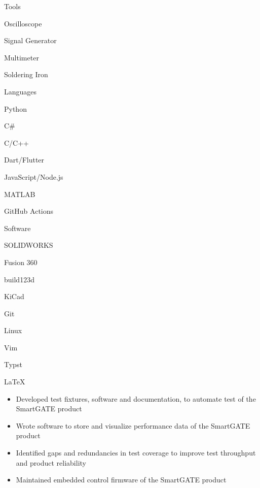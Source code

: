 \documentclass{resume}
\author{Jasper Chan}
\begin{document}
\maketitle

\vspace{-1em} %
\TechnicalSkills

\begin{TechSkills}{Tools}
    \item Oscilloscope
    \item Signal Generator
    \item Multimeter
    \item Soldering Iron
\end{TechSkills}
\begin{TechSkills}{Languages}
    \item Python
    \item C\#
    \item C/C++
    \item Dart/Flutter
    \item JavaScript/Node.js
    \item MATLAB
    \item GitHub Actions
\end{TechSkills}
\begin{TechSkills}{Software}
    \item SOLIDWORKS
    \item Fusion 360
    \item build123d
    \item KiCad
    \item Git
    \item Linux
    \item Vim
    \item Typst
    \item \LaTeX
\end{TechSkills}

\WorkExperience

\begin{itemize}
    \item Developed test fixtures, software and documentation, to automate test of the SmartGATE product
    \item Wrote software to store and visualize performance data of the SmartGATE product
    \item Identified gaps and redundancies in test coverage to improve test throughput and product reliability
    \item Maintained embedded control firmware of the SmartGATE product
\end{itemize}
\end{document}
